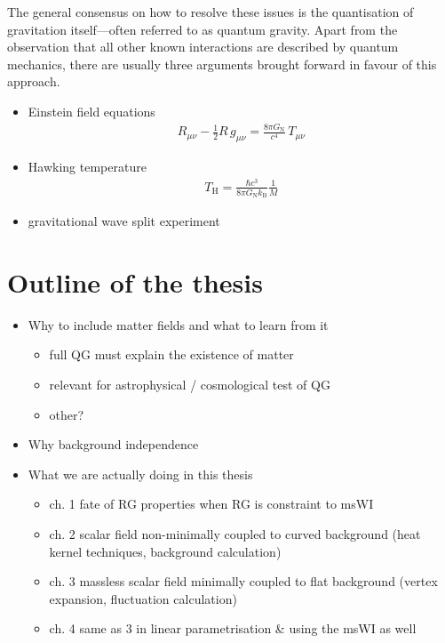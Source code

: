 \documentclass[11pt]{book} %
\numberwithin{equation}{chapter}
\begin{document}
The general consensus on how to resolve these issues is the quantisation of gravitation
itself---often referred to as quantum gravity.
Apart from the observation that all other known interactions are described by
quantum mechanics, there are usually three arguments brought forward in favour of this
approach.
\begin{itemize}
  \item Einstein field equations
    \begin{align*}
      R_{\mu \nu} - \tfrac{1}{2}R \, g_{\mu \nu} = \frac{8 \pi G_\mathrm N }{c^4} \, T_{\mu \nu}
    \end{align*}
  \item Hawking temperature
    \begin{align*}
      T_\mathrm H = \frac{\hbar c^3}{8 \pi G_\mathrm N k_\mathrm{B}} \frac 1M
    \end{align*}
  \item gravitational wave split experiment
\end{itemize}




\section*{Outline of the thesis}

\begin{itemize}
  \item Why to include matter fields and what to learn from it
    \begin{itemize}
      \item full QG must explain the existence of matter
      \item relevant for astrophysical / cosmological test of QG
      \item other?
    \end{itemize}
  \item Why background independence
  \item What we are actually doing in this thesis
    \begin{itemize}
      \item ch. 1 fate of RG properties when RG is constraint to msWI
      \item ch. 2 scalar field non-minimally coupled to curved background (heat kernel techniques, background calculation)
      \item ch. 3 massless scalar field minimally coupled to flat background (vertex expansion, fluctuation calculation)
      \item ch. 4 same as 3 in linear parametrisation \& using the msWI as well
    \end{itemize}
\end{itemize}
\end{document}
